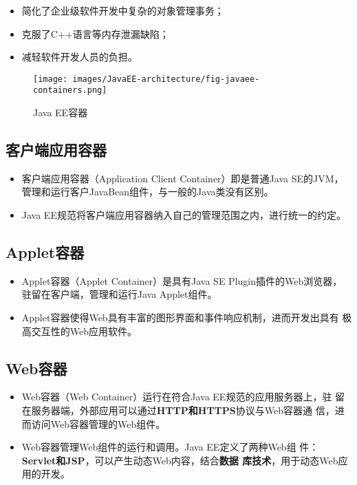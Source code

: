   
\begin{itemize}
\item 简化了企业级软件开发中复杂的对象管理事务；
\item 克服了C++语言等内存泄漏缺陷；
\item 减轻软件开发人员的负担。
\end{itemize}

\begin{figure}[htb]
\centering
\texttt{[image: images/JavaEE-architecture/fig-javaee-containers.png]}
\caption{Java EE容器}
\label{fig:javaee-containers}
\end{figure}

\subsection{客户端应用容器} 

\begin{itemize}
\item 客户端应用容器（Application Client Container）即是普通Java
  SE的JVM，管理和运行客户JavaBean组件，与一般的Java类没有区别。
\item Java EE规范将客户端应用容器纳入自己的管理范围之内，进行统一的约定。
\end{itemize}

\subsection{Applet容器} 

\begin{itemize}
\item Applet容器（Applet Container）是具有Java SE Plugin插件的Web浏览器，
  驻留在客户端，管理和运行Java Applet组件。
\item Applet容器使得Web具有丰富的图形界面和事件响应机制，进而开发出具有
  极高交互性的Web应用软件。
\end{itemize}

\subsection{Web容器} 

\begin{itemize}
\item Web容器（Web Container）运行在符合Java EE规范的应用服务器上，驻
  留在服务器端，外部应用可以通过{\bf\Blue HTTP和HTTPS}协议与Web容器通
  信，进而访问Web容器管理的Web组件。
\item Web容器管理Web组件的运行和调用。Java EE定义了两种Web组
  件：{\bf\Blue Servlet和JSP}，可以产生动态Web内容，结合{\bf\Blue 数据
    库技术}，用于动态Web应用的开发。
\end{itemize}

